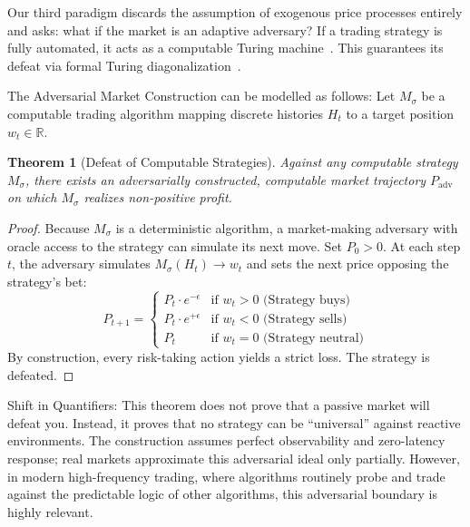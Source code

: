 \documentclass[aps,pra,reprint,superscriptaddress,amsmath,amssymb]{revtex4-2}
\theoremstyle{plain}
\newtheorem{theorem}{Theorem}
\theoremstyle{definition}
\theoremstyle{remark}
\begin{document}
Our third paradigm discards the assumption of exogenous price processes entirely and asks: what if the market is an adaptive adversary? If a trading strategy is fully automated, it acts as a computable Turing machine~\cite{IsasaMartin2022Computability}. This guarantees its defeat via formal Turing diagonalization~\cite{turing-36,Yanofsky-BSL:9051621}.

The Adversarial Market Construction can be modelled as follows: Let $M_\sigma$ be a computable trading algorithm mapping discrete histories $H_t$ to a target position $w_t \in \mathbb{R}$.

\begin{theorem}[Defeat of Computable Strategies]
  \label{thm:diagonalization}
  Against any computable strategy $M_\sigma$, there exists an adversarially constructed, computable market trajectory $P_{\text{adv}}$ on which $M_\sigma$ realizes non-positive profit.
\end{theorem}

\begin{proof}
  Because $M_\sigma$ is a deterministic algorithm, a market-making adversary with oracle access to the strategy can simulate its next move. Set $P_0 > 0$. At each step $t$, the adversary simulates $M_\sigma(H_t) \to w_t$ and sets the next price opposing the strategy's bet:
  \begin{equation}
    P_{t+1} =
    \begin{cases}
      P_t \cdot e^{-\epsilon} & \text{if } w_t > 0 \text{ (Strategy buys)} \\
      P_t \cdot e^{+\epsilon} & \text{if } w_t < 0 \text{ (Strategy sells)} \\
      P_t & \text{if } w_t = 0 \text{ (Strategy neutral)}
    \end{cases}
  \end{equation}
  By construction, every risk-taking action yields a strict loss. The strategy is defeated.
\end{proof}

Shift in Quantifiers: This theorem does not prove that a passive market will defeat you. Instead, it proves that no strategy can be ``universal'' against reactive environments. The construction assumes perfect observability and zero-latency response; real markets approximate this adversarial ideal only partially. However, in modern high-frequency trading, where algorithms routinely probe and trade against the predictable logic of other algorithms, this adversarial boundary is highly relevant.
\end{document}
